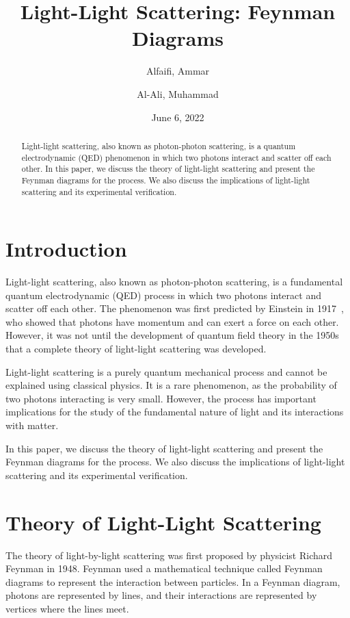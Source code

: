 \documentclass{article}
\title{Light-Light Scattering: Feynman Diagrams}
\author{Alfaifi, Ammar \and Al-Ali, Muhammad}
\date{June 6, 2022}
\begin{document}
\maketitle

\begin{abstract}
	Light-light scattering, also known as photon-photon scattering, is a quantum electrodynamic (QED) phenomenon in which two photons interact and scatter off each other. In this paper, we discuss the theory of light-light scattering and present the Feynman diagrams for the process. We also discuss the implications of light-light scattering and its experimental verification.
\end{abstract}

\section{Introduction}

Light-light scattering, also known as photon-photon scattering, is a fundamental quantum electrodynamic (QED) process in which two photons interact and scatter off each other. The phenomenon was first predicted by Einstein in 1917~\cite{einstein}, who showed that photons have momentum and can exert a force on each other. However, it was not until the development of quantum field theory in the 1950s that a complete theory of light-light scattering was developed.

Light-light scattering is a purely quantum mechanical process and cannot be explained using classical physics. It is a rare phenomenon, as the probability of two photons interacting is very small. However, the process has important implications for the study of the fundamental nature of light and its interactions with matter.

In this paper, we discuss the theory of light-light scattering and present the Feynman diagrams for the process. We also discuss the implications of light-light scattering and its experimental verification.

\section{Theory of Light-Light Scattering}

The theory of light-by-light scattering was first proposed by physicist Richard Feynman in 1948. Feynman used a mathematical technique called Feynman diagrams to represent the interaction between particles. In a Feynman diagram, photons are represented by lines, and their interactions are represented by vertices where the lines meet.
\end{document}
